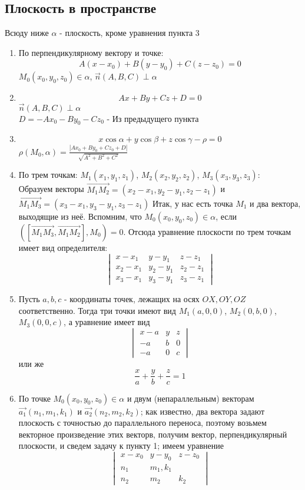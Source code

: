 \subsection{Плоскость в пространстве}
Всюду ниже $\alpha$ - плоскость, кроме уравнения пункта 3 
\begin{enumerate}
\item По перпендикулярному вектору и точке:
$$A(x-x_0)+B(y-y_0)+C(z-z_0)=0$$
$M_0(x_0,y_0,z_0)\in\alpha$, $\Vec{n}(A,B,C)\perp\alpha$
\item
$$Ax+By+Cz+D=0$$
 $\Vec{n}(A,B,C)\perp\alpha$\\
$D=-Ax_0-By_0-Cz_0$ - Из предыдущего пункта
\item
$$x\cos\alpha+y\cos\beta+z\cos\gamma-\rho=0$$
$\rho(M_0,\alpha)=\frac{|Ax_0+By_0+Cz_0+D|}{\sqrt{A^2+B^2+C^2}}$
\item По трем точкам: 
$M_1(x_1,y_1,z_1)$, $M_2(x_2,y_2,z_2)$, $M_3(x_3,y_3,z_3)$:\\
Образуем векторы $\Vec{M_1M_2}=(x_2-x_1,y_2-y_1,z_2-z_1)$
и $\Vec{M_1M_3}=(x_3-x_1,y_3-y_1,z_3-z_1)$
Итак, у нас есть точка $M_1$ и два вектора, выходящие из неё. Вспомним, что
$M_0(x_0,y_0,z_0)\in\alpha$, если $([\Vec{M_1M_3},\Vec{M_1M_2}],M_0)=0$. 
Отсюда уравнение плоскости по трем точкам имеет вид определителя:
$$\begin{vmatrix}x-x_1&y-y_1&z-z_1\\x_2-x_1&y_2-y_1&z_2-z_1\\
x_3-x_1&y_3-y_1&z_3-z_1
\end{vmatrix}$$
\item Пусть $a,b,c$ - координаты точек, лежащих на осях $OX,OY,OZ$
соответственно.  Тогда три точки имеют вид
$M_1(a,0,0)$, $M_2(0,b,0)$, $M_3(0,0,c)$, а уравнение имеет вид
$$\begin{vmatrix}x-a&y&z\\-a&b&0\\-a&0&c\end{vmatrix}$$
или же
$$\frac{x}{a}+\frac{y}{b}+\frac{z}{c}=1$$
\item По точке $M_0(x_0,y_0,z_0)\in\alpha$ и двум (непараллельным) векторам
$\Vec{a_1}(n_1,m_1,k_1)$ и $\Vec{a_2}(n_2,m_2,k_2)$; как известно,
два вектора задают плоскость с точностью до параллельного переноса,
поэтому возьмем векторное произведение этих векторв, получим вектор,
перпендикулярный плоскости, и сведем задачу к пункту 1; имеем уравнение
$$\begin{vmatrix}x-x_0&y-y_0&z-z_0\\n_1&m_1,k_1\\n_2&m_2&k_2
\end{vmatrix}$$
\end{enumerate}

